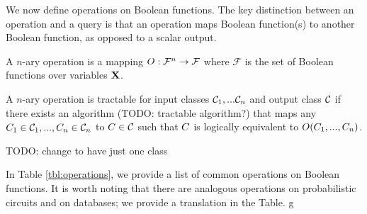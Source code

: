 We now define operations on Boolean functions. The key distinction between an operation and a query is that an operation maps Boolean function(s) to another Boolean function, as opposed to a scalar output.

\begin{definition}[Operation]
    A $n$-ary operation is a mapping $O: \mathcal{F}^n \to \mathcal{F}$ where $\mathcal{F}$ is the set of Boolean functions over variables $\mathbf{X}$.
\end{definition}

\begin{definition}
    A $n$-ary operation is tractable for input classes $\mathcal{C}_1, ... \mathcal{C}_n$ and output class $\mathcal{C}$ if there exists an algorithm (TODO: tractable algorithm?)
    that maps any $C_1 \in \mathcal{C}_1, ..., C_n \in \mathcal{C}_n$ to $C \in \mathcal{C}$ such that $C$ is logically equivalent to $O(C_1, ..., C_n)$.

    TODO: change to have just one class
\end{definition}

In Table \ref{tbl:operations}, we provide a list of common operations on Boolean functions. It is worth noting that there are analogous operations on probabilistic circuits and on databases; we provide a translation in the Table. g




